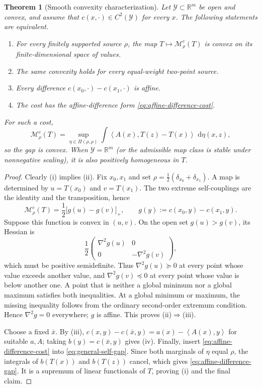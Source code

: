 \documentclass[11pt,a4paper]{article}
\newtheorem{theorem}{Theorem}[section]
\theoremstyle{definition}
\theoremstyle{remark}
\newcommand{\R}{\mathbb R}
\newcommand{\Mcal}{\mathcal M}
\newcommand{\dd}{\,\mathrm d}
\newcommand{\ip}[2]{\left\langle #1,#2\right\rangle}
\begin{document}
\begin{theorem}[Smooth convexity characterization]\label{thm:cost-convexity-characterization}
Let $\mathcal Y\subset\R^m$ be open and convex, and assume that
$c(x,\cdot)\in C^2(\mathcal Y)$ for every $x$. The following statements are
equivalent.
\begin{enumerate}[label=(\roman*)]
  \item For every finitely supported source $\rho$, the map
    $T\mapsto\Mcal_\rho^c(T)$ is convex on its finite-dimensional space of
    values.
  \item The same convexity holds for every equal-weight two-point source.
  \item Every difference $c(x_0,\cdot)-c(x_1,\cdot)$ is affine.
  \item The cost has the affine-difference form
    \eqref{eq:affine-difference-cost}.
\end{enumerate}
For such a cost,
\begin{equation}\label{eq:affine-difference-gap}
  \Mcal_\rho^c(T)
  =\sup_{\eta\in\Pi(\rho,\rho)}
    \int\ip{A(x)}{T(z)-T(x)}\,\dd\eta(x,z),
\end{equation}
so the gap is convex. When $\mathcal Y=\R^m$ (or the admissible map class is
stable under nonnegative scaling), it is also positively homogeneous in $T$.
\end{theorem}

\begin{proof}
Clearly (i) implies (ii). Fix $x_0,x_1$ and set
$\rho=\tfrac12(\delta_{x_0}+\delta_{x_1})$. A map is determined by
$u=T(x_0)$ and $v=T(x_1)$. The two extreme self-couplings are the identity
and the transposition, hence
\begin{equation}\label{eq:two-point-general-gap}
  \Mcal_\rho^c(T)
  =\frac12\bigl[g(u)-g(v)\bigr]_+,
  \qquad
  g(y):=c(x_0,y)-c(x_1,y).
\end{equation}
Suppose this function is convex in $(u,v)$. On the open set $g(u)>g(v)$,
its Hessian is
\[
  \frac12
  \begin{pmatrix}
    \nabla^2g(u)&0\\[1mm]0&-\nabla^2g(v)
  \end{pmatrix},
\]
which must be positive semidefinite. Thus $\nabla^2g(u)\succeq0$ at every
point whose value exceeds another value, and $\nabla^2g(v)\preceq0$ at every
point whose value is below another one. A point that is neither a global
minimum nor a global maximum satisfies both inequalities. At a global
minimum or maximum, the missing inequality follows from the ordinary
second-order extremum condition. Hence $\nabla^2g=0$ everywhere; $g$ is
affine. This proves (ii)$\Rightarrow$(iii).

Choose a fixed $\bar x$. By (iii),
$c(x,y)-c(\bar x,y)=a(x)-\ip{A(x)}{y}$ for suitable $a,A$; taking
$b(y)=c(\bar x,y)$ gives (iv). Finally, insert
\eqref{eq:affine-difference-cost} into
\eqref{eq:general-self-gap}. Since both marginals of $\eta$ equal $\rho$,
the integrals of $b(T(x))$ and $b(T(z))$ cancel, which gives
\eqref{eq:affine-difference-gap}. It is a supremum of linear functionals of
$T$, proving (i) and the final claim.
\end{proof}
\end{document}
